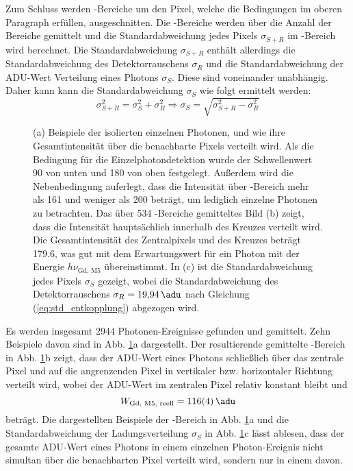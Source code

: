 \noindent
Zum Schluss werden -Bereiche um den Pixel, welche die Bedingungen im oberen Paragraph erfüllen, ausgeschnitten. Die -Bereiche werden über die Anzahl der Bereiche gemittelt und die Standardabweichung jedes Pixels $\sigma_{S+R}$ im -Bereich wird berechnet. Die Standardabweichung $\sigma_{S+R}$ enthält allerdings die Standardabweichung des Detektorrauschens $\sigma_{R}$ und die Standardabweichung der ADU-Wert Verteilung eines Photons $\sigma_{S}$. Diese sind voneinander unabhängig. Daher kann kann die Standardabweichung $\sigma_{S}$ wie folgt ermittelt werden:
\begin{equation}
    \sigma_{S+R}^2 = \sigma_{S}^2 + \sigma_{R}^2 \Rightarrow \sigma_{S} = \sqrt{\sigma_{S+R}^2 - \sigma_{R}^2}
    \label{eq:std_entkopplung}
\end{equation}
\begin{figure}[H]
    \centering
    
    \caption{(a) Beispiele der isolierten einzelnen Photonen, und wie ihre Gesamtintensität über die benachbarte Pixels verteilt wird. Als die Bedingung für die Einzelphotondetektion wurde der Schwellenwert \SI{90}{\adu} von unten und \SI{180}{\adu} von oben festgelegt. Außerdem wird die Nebenbedingung auferlegt, dass die Intensität über -Bereich mehr als \SI{161}{\adu} und weniger als \SI{200}{\adu} beträgt, um lediglich einzelne Photonen zu betrachten. Das über 534 -Bereiche gemitteltes Bild (b) zeigt, dass die Intensität hauptsächlich innerhalb des Kreuzes verteilt wird. Die Gesamtintensität des Zentralpixels und des Kreuzes beträgt \SI{179.6}{\adu}, was gut mit dem Erwartungswert für ein Photon mit der Energie $h\nu_\text{Gd, M5}$ übereinstimmt. In (c) ist die Standardabweichung jedes Pixels $\sigma_{S}$ gezeigt, wobei die Standardabweichung des Detektorrauschens $\sigma_R = \SI{19.94}{\adu}$ nach Gleichung (\ref{eq:std_entkopplung}) abgezogen wird.}
    \label{fig:examples_average_std_5x5_hotspot}
\end{figure}
\noindent
Es werden insgesamt 2944 Photonen-Ereignisse gefunden und gemittelt. Zehn Beispiele davon sind in Abb. \ref{fig:examples_average_std_5x5_hotspot}a dargestellt. Der resultierende gemittelte -Bereich in Abb. \ref{fig:examples_average_std_5x5_hotspot}b zeigt, dass der ADU-Wert eines Photons schließlich über das zentrale Pixel und auf die angrenzenden Pixel in vertikaler bzw. horizontaler Richtung verteilt wird, wobei der ADU-Wert im zentralen Pixel relativ konstant bleibt und 
\begin{equation}
    W_\text{Gd, M5, reell}  = \SI{116(4)}{\adu} 
\end{equation}
beträgt. Die dargestellten Beispiele der -Bereich in Abb. \ref{fig:examples_average_std_5x5_hotspot}a und die Standardabweichung der Ladungsverteilung $\sigma_{S}$ in Abb. \ref{fig:examples_average_std_5x5_hotspot}c lässt ablesen, dass der gesamte ADU-Wert eines Photons in einem einzelnen Photon-Ereignis nicht simultan über die benachbarten Pixel verteilt wird, sondern nur in einem davon. 

